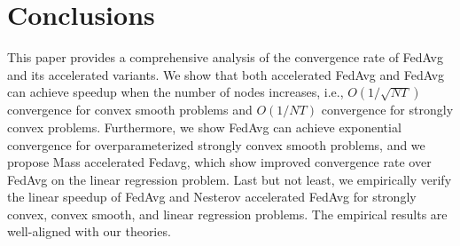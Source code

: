 
\section{Conclusions}
This paper provides a comprehensive analysis of the convergence rate of FedAvg
and its accelerated variants. We show that both accelerated FedAvg and FedAvg
can achieve speedup when the number of nodes increases, i.e., $O(1/\sqrt{NT})$
convergence for convex smooth problems and $O(1/NT)$ convergence for strongly 
convex problems. Furthermore, we show FedAvg can achieve exponential 
convergence for overparameterized strongly convex smooth problems, and we propose Mass accelerated Fedavg, which show improved convergence rate over
FedAvg on the linear regression problem. Last but not least, we empirically
verify the linear speedup of FedAvg and Nesterov accelerated FedAvg for strongly convex, convex smooth, and linear regression problems. The empirical results are well-aligned with our theories. 